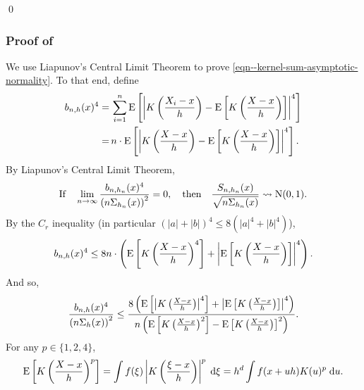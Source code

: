 \qed

\subsubsection{Proof of
\texorpdfstring{}{Theorem
\ref{thm--kernel-sum-asymptotic-normality}}}

We use Liapunov's Central Limit Theorem to prove
\eqref{eqn--kernel-sum-asymptotic-normality}.
To that end, define
\begin{align*}
  b_{n, h} (x)^{4} =
  & \, \sum_{i = 1}^{n} \mathrm{E} \left[ \left| K \left( \frac{X_{i} - x}{h} \right) -
  \mathrm{E} \left[ K \left( \frac{X - x}{h} \right) \right] \right|^{4} \right] \\
  =
  & \, n \cdot \mathrm{E} \left[ \left| K \left( \frac{X - x}{h} \right) - \mathrm{E} \left[ K
  \left( \frac{X - x}{h} \right) \right] \right|^{4} \right].
\end{align*}
By Liapunov's Central Limit Theorem,
\begin{equation}
  \text{If} \quad \lim_{n \to \infty} \frac{b_{n, h_{n}} (x)^{4}}{\left( n
  \Sigma_{h_{n}} (x) \right)^{2}} = 0, \quad \text{then} \quad \frac{S_{n,
  h_{n}} (x)}{\sqrt{n \Sigma_{h_{n}} (x)}} \rightsquigarrow \mathrm{N} (0, 1).
  \label{eqn--liapunov-clt}
\end{equation}
By the \(C_{r}\) inequality (in particular \((|a| + |b|)^{4} \leq 8 \left(
|a|^{4} + |b|^{4} \right)\)),
\begin{equation*}
  b_{n, h} (x)^{4} \leq 8 n \cdot \left( \mathrm{E} \left[ K \left( \frac{X -
  x}{h} \right)^{4} \right] + \left| \mathrm{E} \left[ K \left( \frac{X - x}{h}
  \right) \right] \right|^{4} \right).
\end{equation*}
And so,
\begin{equation}
  \frac{b_{n, h} (x)^{4}}{\left( n \Sigma_{h} (x) \right)^{2}} \leq \frac{8
  \left( \mathrm{E} \left[ \left| K \left( \frac{X - x}{h} \right) \right|^{4} \right] +
  \left| \mathrm{E} \left[ K \left( \frac{X - x}{h} \right) \right] \right|^{4}
  \right)}{n \left( \mathrm{E} \left[ K \left( \frac{X - x}{h} \right)^{2} \right] - \mathrm{E}
  \left[ K \left( \frac{X - x}{h} \right) \right]^{2} \right)}.
  \label{eqn--bnh-var-ratio-bound}
\end{equation}
For any \(p \in \{1, 2, 4\}\),
\begin{equation}
  \mathrm{E} \left[ K \left( \frac{X - x}{h} \right)^{p} \right] = \int f (\xi) \left| K
  \left( \frac{\xi - x}{h} \right) \right|^{p} \; \mathrm{d} \xi = h^{d} \int f
  (x + u h) K (u)^{p} \; \mathrm{d} u.
  \label{eqn--kernel-local-moment}
\end{equation}
